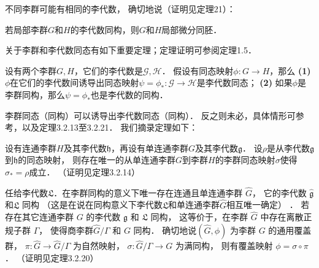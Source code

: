 不同李群可能有相同的李代数，
确切地说（证明见\parencite[\S 3.7]{huangxg-2024}定理21）：
\begin{theorem}\label{chlg:thm_g2G}
    若局部李群$G$和$H$的李代数同构，则$G$和$H$局部微分同胚．
\end{theorem}


关于李群和李代数同态有如下重要定理；定理证明可参阅\parencite[\S 6.1]{cc2001-zh}定理1.5． %
\begin{theorem}\label{chlg:thm_tglie}
    设有两个李群$G,H$，它们的李代数是$\mathscr{G},\mathscr{H}$．
    假设有同态映射$\phi:G\to H$，那么
    {\bfseries (1)} $\phi$在它们的李代数间诱导出同态映射$\psi=\phi_{*}:\mathscr{G}\to \mathscr{H}$是李代数同态；    
    {\bfseries (2)} 如果$\phi$是李群同构，那么$\psi=\phi_{*}$也是李代数的同构．    
\end{theorem}

李群同态（同构）可以诱导出李代数同态（同构）． %
反之则未必，具体情形可参考\parencite[p.226--231]{xuyc-2001}，以及定理3.2.13至3.2.21．
我们摘录定理如下： %
\begin{theorem}\label{chlg:thm_LA2LG}
    设有连通李群$H$及其李代数$\mathfrak{h}$，再设有单连通李群$G$及其李代数$\mathfrak{g}$．
    设$\rho$是从李代数$\mathfrak{g}$到$\mathfrak{h}$的同态映射，
    则存在唯一的从单连通李群$G$到李群$H$的李群同态映射$\sigma$使得$\sigma_{*}=\rho$成立． 
    （证明见\parencite[p.235]{xuyc-2001}定理3.2.14）
\end{theorem}

\begin{theorem}\label{chlg:thm_LA2LG-all}
    任给李代数$\mathfrak{L}$．在李群同构的意义下唯一存在连通且单连通李群 $\widehat{G}$，
    它的李代数 $\widehat{\mathfrak{g}}$和$\mathfrak{L}$ 同构
    （这是在说在同构意义下李代数$\mathfrak{L}$和单连通李群$\widehat{G}$相互唯一确定）   ．
    若存在其它连通李群 $G$ 的李代数 $\mathfrak{g}$ 和 $\mathfrak{L}$ 同构，
    这等价于，在李群 $\widehat{G}$ 中存在离散正规子群 $\Gamma$，
    使得商李群$\widehat{G} / \Gamma$ 和 $G$ 同构．
    确切地说$(\widehat{G}, \phi)$ 为李群 $G$ 的通用覆盖群，
    $\pi: \widehat{G} \rightarrow \widehat{G} / \Gamma $ 为自然映射，
    $\sigma: \widehat{G} / \Gamma \rightarrow G$ 为满同构，
    则有覆盖映射 $\phi=\sigma \circ \pi$． 
    （证明见\parencite[p.238]{xuyc-2001}定理3.2.20）
\end{theorem}




